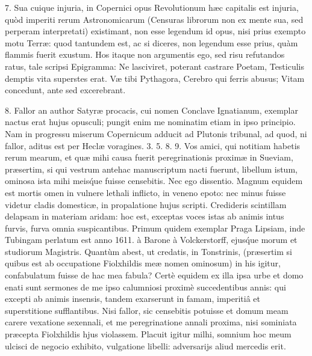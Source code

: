 \documentclass[a4paper, 11pt, oneside, polutonikogreek, german]{article}
\begin{document}
7. Sua cuique injuria, in Copernici opus Revolutionum hæc capitalis est injuria, quòd imperiti rerum Astronomicarum (Censuras librorum non ex mente sua, sed perperam interpretati) existimant, non esse legendum id opus, nisi prius exempto motu Terræ: quod tantundem est, ac si diceres, non legendum esse prius, quàm flammis fuerit exustum. Hos itaque non argumentis ego, sed risu refutandos ratus, tale scripsi Epigramma:\hspace*{5mm}
Ne lasciviret, poterant castrare Poetam,\hspace*{5mm}
Testiculis demptis vita superstes erat.\hspace*{5mm}
Væ tibi Pythagora, Cerebro qui ferris abusus;\hspace*{5mm}
Vitam concedunt, ante sed excerebrant.

8. Fallor an author Satyræ procacis, cui nomen Conclave Ignatianum, exemplar nactus erat hujus opusculi; pungit enim me nominatim etiam in ipso principio. Nam in progressu miserum Copernicum adducit ad Plutonis tribunal, ad quod, ni fallor, aditus est per Heclæ voragines. 3. 5. 8. 9. Vos amici, qui notitiam habetis rerum mearum, et quæ mihi causa fuerit peregrinationis proximæ in Sueviam, præsertim, si qui vestrum antehac manuscriptum nacti fuerunt, libellum istum, ominosa ista mihi meis\'que fuisse censebitis. Nec ego dissentio. Magnum equidem est mortis omen in vulnere lethali inflicto, in veneno epoto: nec minus fuisse videtur cladis domesticæ, in propalatione hujus scripti. Credideris scintillam delapsam in materiam aridam: hoc est, exceptas voces istas ab animis intus furvis, furva omnia suspicantibus. Primum quidem exemplar Praga Lipsiam, inde Tubingam perlatum est anno 1611. à Barone à Volckerstorff, ejus\'que morum et studiorum Magistris. Quantùm abest, ut credatis, in Tonstrinis, (præsertim si quibus est ab occupatione Fiolxhildis meæ nomen ominosum) in his igitur, confabulatum fuisse de hac mea fabula? Certè equidem ex illa ipsa urbe et domo enati sunt sermones de me ipso calumniosi proximè succedentibus annis: qui excepti ab animis insensis, tandem exarserunt in famam, imperitiâ et superstitione sufflantibus. Nisi fallor, sic censebitis potuisse et domum meam carere vexatione sexennali, et me peregrinatione annali proxima, nisi sominiata præcepta Fiolxhildis hjus violassem. Placuit igitur milhi, somnium hoc meum ulcisci de negocio exhibito, vulgatione libelli: adversarijs aliud mercedis erit.
\end{document}
